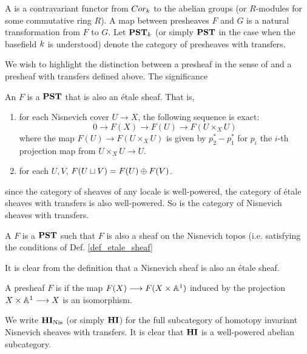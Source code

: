 \begin{defn}\label{def_pst}
A  is a contravariant functor from 
$Cor_k$ to the abelian groups (or $R$-modules for some 
commutative ring $R$). A map between presheaves $F$ and $G$ is a 
natural transformation from $F$ to $G$. Let $\mathbf{PST}_{k}$ (or
simply $\mathbf{PST}$ in the case when the basefield $k$ is 
understood) denote the category of presheaves with transfers.
\end{defn}

\begin{rmk}
We wish to highlight the distinction between a presheaf in the 
sense of \cite{Hart} and a presheaf with transfers defined above.
The significance
\end{rmk}


\begin{defn}\label{def_etale_sheaf}
An  $F$ is a $\mathbf{PST}$ that is also
an \'etale sheaf. That is,
\begin{enumerate}
\item for each Nisnevich cover $U \to X$, the following sequence 
is exact:
\[
0 \to F(X) \to F(U) \to F(U \times_X U)
\]
where the map $F(U) \to F(U \times_X U)$ is given by $p_2^* - 
p_1^*$ for $p_i$ the $i$-th projection map from $U \times_X U
\to U$.

\item for each $U, V$, $F(U \sqcup V) = F(U) \oplus F(V)$.
\end{enumerate}
\end{defn}

since the category of sheaves of any locale is well-powered, the 
category of \'etale sheaves with transfers is also well-powered. 
So is the category of Nisnevich sheaves with transfers.



\begin{defn}\label{def_nis_sheaf}
A  $F$ is a $\mathbf{PST}$ such that $F$ is also a
sheaf on the Nisnevich topos (i.e. satisfying the conditions of
Def. \ref{def_etale_sheaf}
\end{defn}

\begin{rmk}
It is clear from the definition that a Nisnevich sheaf is also
an \'etale sheaf.
\end{rmk}

\begin{defn}
A presheaf $F$ is  if the map $F(X) \longrightarrow 
F(X \times \mathbb{A}^1)$ induced by the projection $X \times \mathbb{A}^1 \longrightarrow X$ 
is an isomorphism.

We write $\mathbf{HI}_{\mathrm{Nis}}$ (or simply $\mathbf{HI}$) for the full subcategory of 
homotopy invariant Nisnevich sheaves with transfers. It is clear
that $\mathbf{HI}$ is a well-powered abelian subcategory.
\end{defn}

